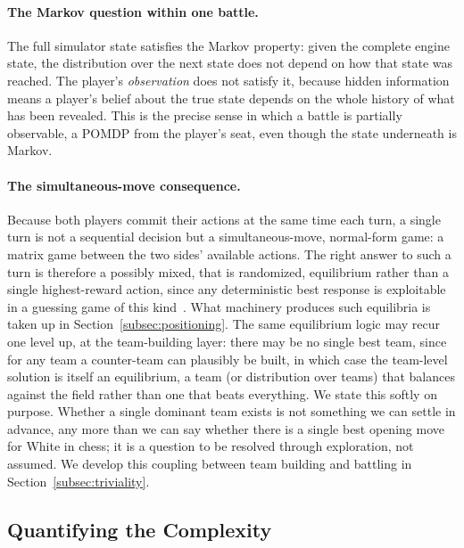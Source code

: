 \paragraph{The Markov question within one battle.}
The full simulator state satisfies the Markov property: given the complete engine
state, the distribution over the next state does not depend on how that state was
reached. The player's \emph{observation} does not satisfy it, because hidden
information means a player's belief about the true state depends on the whole
history of what has been revealed. This is the precise sense in which a battle is
partially observable, a POMDP from the player's seat, even though the state
underneath is Markov. 

\paragraph{The simultaneous-move consequence.}
Because both players commit their actions at the same time each turn, a single
turn is not a sequential decision but a simultaneous-move, normal-form game: a
matrix game between the two sides' available actions. The right answer to such a
turn is therefore a possibly mixed, that is randomized, equilibrium rather than a
single highest-reward action, since any deterministic best response is exploitable
in a guessing game of this kind~\cite{lanctot2014smmcts}. What machinery produces
such equilibria is taken up in Section~\ref{subsec:positioning}. The same
equilibrium logic may recur one level up, at the team-building layer: there may be
no single best team, since for any team a counter-team can plausibly be built, in
which case the team-level solution is itself an equilibrium, a team (or
distribution over teams) that balances against the field rather than one that
beats everything. We state this softly on purpose. Whether a single dominant team
exists is not something we can settle in advance, any more than we can say whether
there is a single best opening move for White in chess; it is a question to be
resolved through exploration, not assumed. We develop
this coupling between team building and battling in
Section~\ref{subsec:triviality}.

\subsection{Quantifying the Complexity}
\label{subsec:complexity}
